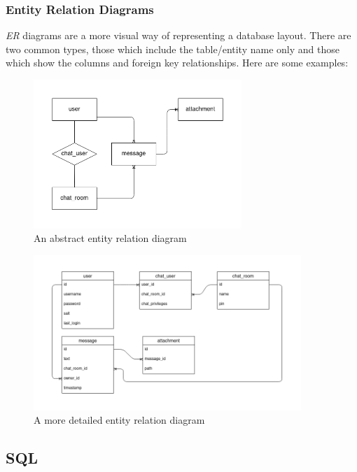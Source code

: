 \documentclass[10pt]{article}
\begin{document}
\subsubsection{Entity Relation Diagrams}
\label{sec:orge7b44cd}

\emph{ER} diagrams are a more visual way of representing a database layout. There are two common types, those which include the table/entity name only and those which show the columns and foreign key relationships. Here are some examples:

\begin{figure}[H]
\centering
\includegraphics[width=0.7\textwidth,keepaspectratio, frame]{./images/er_simple.png}
\caption{An abstract entity relation diagram}
\end{figure}

\begin{figure}[H]
\centering
\includegraphics[width=0.9\textwidth,keepaspectratio, frame]{./images/er_complex.png}
\caption{A more detailed entity relation diagram}
\end{figure}


\subsection{SQL}
\label{sec:org9c13ec6}
\end{document}
